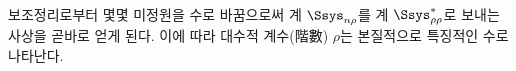 
보조정리로부터 몇몇 미정원을 수로 바꿈으로써 계 $\Ssys_{n\rho}$를 계 $\Ssys^*_{\rho\rho}$로 보내는 사상을 곧바로 얻게 된다. 이에 따라 대수적 계수(階數) $\rho$는 본질적으로 특징적인 수로 나타난다.
